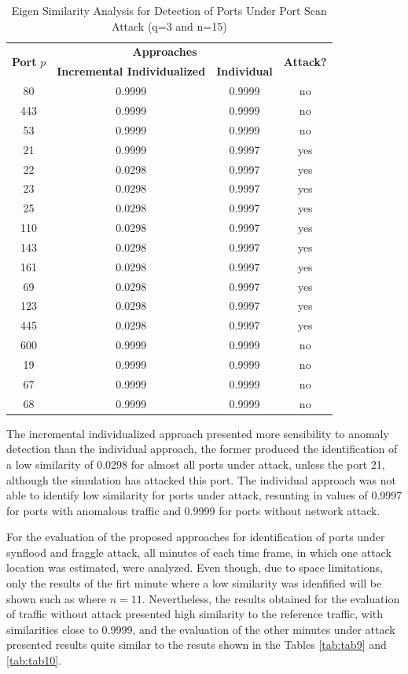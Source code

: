 \documentclass[review]{elsarticle}
\begin{document}
\begin{table}[h!]
  \centering
  \footnotesize
  \caption{Eigen Similarity Analysis for Detection of Ports Under Port Scan Attack (q=3 and n=15)}
  \label{tab:tab8}
  \begin{tabular}{ c c c c }
	\toprule
	\multirow{2}{*}{\textbf{Port} $p$}   &\multicolumn{2}{c}{\textbf{Approaches}} &\multirow{2}{*}{\textbf{Attack?}}\\ 
			\hhline{~--~}
			&\textbf{Incremental Individualized} &\textbf{Individual}\\
	\midrule
	80 &0.9999 &0.9999 &no \\
	443 &0.9999 &0.9999 &no \\
	53 &0.9999 &0.9999 &no \\
	21 &0.9999 &0.9997 &yes \\
	22 &0.0298 &0.9997 &yes \\
	23 &0.0298 &0.9997 &yes \\
	25 &0.0298 &0.9997 &yes \\
	110 &0.0298 &0.9997 &yes \\
	143 &0.0298 &0.9997 &yes \\
	161 &0.0298 &0.9997 &yes \\
	69 &0.0298 &0.9997 &yes \\
	123 &0.0298 &0.9997 &yes \\
	445 &0.0298 &0.9997 &yes \\
	600 &0.9999 &0.9999 &no \\
	19 &0.9999 &0.9999 &no \\
	67 &0.9999 &0.9999 &no \\
	68 &0.9999 &0.9999 &no \\
    \bottomrule
  \end{tabular}
\end{table}

The incremental individualized approach presented more sensibility to anomaly detection than the individual approach, the former produced the identification of a low similarity of 0.0298 for almost all ports under attack, unless the port 21, although the simulation has attacked this port. The individual approach was not able to identify low similarity for ports under attack, resunting in values of 0.9997 for ports with anomalous traffic and 0.9999 for ports without network attack.

For the evaluation of the proposed approaches for identification of ports under synflood and fraggle attack, all minutes of each time frame, in which one attack location was estimated, were analyzed. Even though, due to space limitations, only the results of the firt minute where a low similarity was idenfified will be shown such as where $n=11$. Nevertheless, the results obtained for the evaluation of traffic without attack presented high similarity to the reference traffic, with similarities close to 0.9999, and the evaluation of the other minutes under attack presented results quite similar to the resuts shown in the Tables \ref{tab:tab9} and \ref{tab:tab10}.
\end{document}

